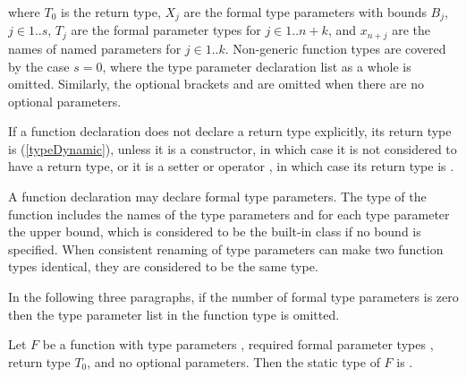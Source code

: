 \documentclass[makeidx]{article}
\begin{document}
\noindent
where $T_0$ is the return type,
$X_j$ are the formal type parameters with bounds $B_j$, $j \in 1 .. s$,
$T_j$ are the formal parameter types for $j \in 1 .. n + k$,
and $x_{n+j}$ are the names of named parameters for $j \in 1 .. k$.
Non-generic function types are covered by the case $s = 0$,
where the type parameter declaration list
\code{<\ldots{}>}
as a whole is omitted.
%
Similarly, the optional brackets \code{[]} and \code{\{\}} are omitted
when there are no optional parameters.


\LMHash{}%
If a function declaration does not declare a return type explicitly,
its return type is \DYNAMIC{} (\ref{typeDynamic}),
unless it is a constructor,
in which case it is not considered to have a return type,
or it is a setter or operator \code{[]=},
in which case its return type is \VOID.

\LMHash{}%
A function declaration may declare formal type parameters.
The type of the function includes the names of the type parameters
and for each type parameter the upper bound,
which is considered to be the built-in class 
if no bound is specified.
When consistent renaming of type parameters
can make two function types identical,
they are considered to be the same type.


\LMHash{}%
In the following three paragraphs,
if the number  of formal type parameters is zero then
the type parameter list in the function type is omitted.

\LMHash{}%
Let $F$ be a function with
type parameters \TypeParametersStd,
required formal parameter types ,
return type $T_0$,
and no optional parameters.
Then the static type of $F$ is
.
\end{document}
